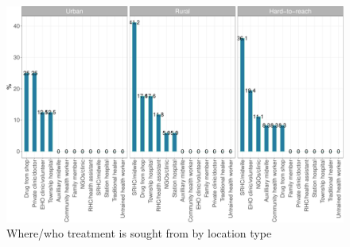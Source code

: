 \documentclass[12pt,a4paper]{article}
\begin{document}
\begin{figure}[H]

{\centering \includegraphics{kayahReport_files/figure-latex/diarrhoea6plot-1} 

}

\caption{Where/who treatment is sought from by location type}\label{fig:diarrhoea6plot}
\end{figure}
\end{document}
